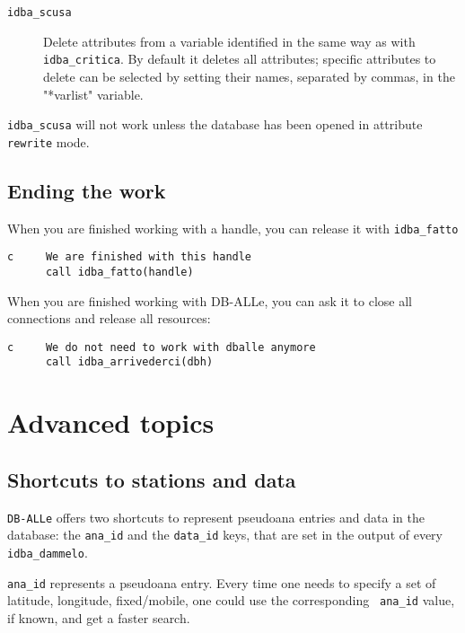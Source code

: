 \documentclass[final,12pt,a4paper,twoside]{book}
\newcommand{\dballe}{{\tt DB-ALLe}}
\begin{document}
\begin{description}
\item[{\tt idba\_scusa}]
  Delete attributes from a variable identified in the same way as with {\tt
  idba\_critica}.  By default it deletes all attributes; specific attributes to
  delete can be selected by setting their names, separated by commas, in the
  "*varlist" variable.
\end{description}

{\tt idba\_scusa} will not work unless the database has been opened in
attribute {\tt rewrite} mode.


\section{Ending the work}

When you are finished working with a handle, you can release it with {\tt idba\_fatto}

\label{fun-idba_fatto}

\begin{verbatim}
c     We are finished with this handle
      call idba_fatto(handle)
\end{verbatim}

When you are finished working with DB-ALLe, you can ask it to close all
connections and release all resources:

\label{fun-idba_arrivederci}

\begin{verbatim}
c     We do not need to work with dballe anymore
      call idba_arrivederci(dbh)
\end{verbatim}

\chapter{Advanced topics}

\section{Shortcuts to stations and data}

\dballe{} offers two shortcuts to represent pseudoana entries and data in the
database: the {\tt ana\_id} and the {\tt data\_id} keys, that are set in the
output of every {\tt idba\_dammelo}.

{\tt ana\_id} represents a pseudoana entry.  Every time one needs to specify a
set of latitude, longitude, fixed/mobile, one could use the corresponding {\tt
ana\_id} value, if known, and get a faster search.
\end{document}
